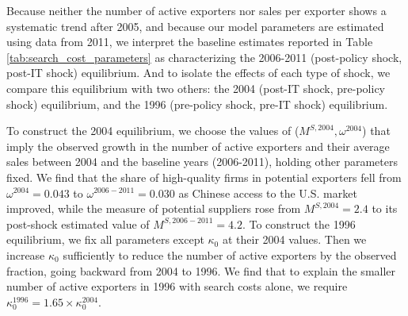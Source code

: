 \documentclass[12pt]{article} \usepackage{amsmath,amssymb,amsthm,geometry,graphicx,setspace,algorithm,algpseudocode,float}
\begin{document}
 Because neither the number of active exporters nor sales per exporter shows a systematic trend after 2005, and because our model parameters are estimated using data from 2011, we interpret the baseline estimates reported in Table \ref{tab:search_cost_parameters} as characterizing the 2006-2011 (post-policy shock, post-IT shock) equilibrium. And to isolate the effects of each type of shock, we compare this equilibrium with two others: the 2004 (post-IT shock, pre-policy shock) equilibrium, and the 1996 (pre-policy shock, pre-IT shock) equilibrium. 
 
 To construct the 2004 equilibrium, we choose the values of ($M^{S,2004},\omega^{2004}$) that imply the observed growth in the number of active exporters and their average sales between 2004 and the baseline years (2006-2011), holding other parameters fixed. We find that the share of high-quality firms in potential exporters fell from $\omega^{2004}=0.043$ to $\omega^{2006-2011}=0.030$ as Chinese access to the U.S. market improved, while the measure of potential suppliers rose from $M^{S,2004}= 2.4$ to its post-shock estimated value of $M^{S,2006-2011}=4.2$. To construct the 1996 equilibrium, we fix all parameters except $\kappa_0$ at their 2004 values. Then we increase $\kappa_0$ sufficiently to reduce the number of active exporters by the observed fraction, going backward from 2004 to 1996. We find that to explain the smaller number of active exporters in 1996 with search costs alone, we require $\kappa_0^{1996} = 1.65 \times \kappa^{2004}_0$.
\end{document}
